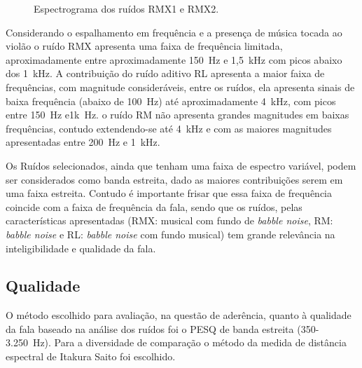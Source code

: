 \begin{figure}[H]
\quad
 \caption{Espectrograma dos ruídos RMX1 e RMX2.}
\label{SRMX}
\end{figure}

Considerando o espalhamento em frequência e a presença de música tocada ao violão o ruído RMX apresenta uma faixa de frequência limitada, aproximadamente entre aproximadamente 150~Hz e 1,5~kHz com picos abaixo dos 1~kHz. A contribuição do ruído aditivo RL apresenta a maior faixa de frequências, com magnitude consideráveis, entre os ruídos, ela apresenta sinais de baixa frequência (abaixo de 100~Hz) até aproximadamente 4~kHz, com picos entre 150~Hz e1k~Hz. o ruído RM não apresenta grandes magnitudes em baixas frequências, contudo extendendo-se até 4~kHz e com as maiores magnitudes apresentadas entre 200~Hz e 1~kHz.

Os Ruídos selecionados, ainda que tenham uma faixa de espectro variável, podem ser considerados como banda estreita, dado as maiores contribuições serem em uma faixa estreita. Contudo é importante frisar que essa faixa de frequência coincide com a faixa de frequência da fala, sendo que os ruídos, pelas características apresentadas (RMX: musical com fundo de \textit{babble noise}, RM: \textit{babble noise} e RL: \textit{babble noise} com fundo musical) tem grande relevância na inteligibilidade e qualidade da fala. 

\subsection{Qualidade}
O método escolhido para avaliação, na questão de aderência, quanto à qualidade da fala baseado na análise dos ruídos foi o PESQ de banda estreita (350-3.250~Hz). Para a diversidade de comparação o método da medida de distância espectral de Itakura Saito foi escolhido. 

